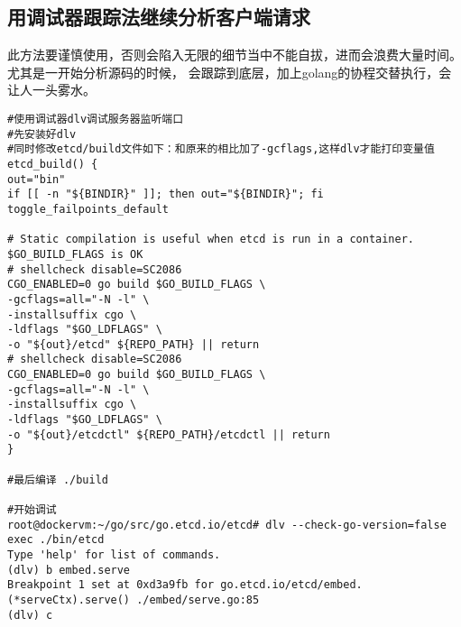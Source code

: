 \subsection{用调试器跟踪法继续分析客户端请求}
此方法要谨慎使用，否则会陷入无限的细节当中不能自拔，进而会浪费大量时间。尤其是一开始分析源码的时候，
会跟踪到底层，加上golang的协程交替执行，会让人一头雾水。
\begin{verbatim}
#使用调试器dlv调试服务器监听端口
#先安装好dlv
#同时修改etcd/build文件如下：和原来的相比加了-gcflags,这样dlv才能打印变量值
etcd_build() {
out="bin"
if [[ -n "${BINDIR}" ]]; then out="${BINDIR}"; fi
toggle_failpoints_default

# Static compilation is useful when etcd is run in a container. $GO_BUILD_FLAGS is OK
# shellcheck disable=SC2086
CGO_ENABLED=0 go build $GO_BUILD_FLAGS \
-gcflags=all="-N -l" \
-installsuffix cgo \
-ldflags "$GO_LDFLAGS" \
-o "${out}/etcd" ${REPO_PATH} || return
# shellcheck disable=SC2086
CGO_ENABLED=0 go build $GO_BUILD_FLAGS \
-gcflags=all="-N -l" \
-installsuffix cgo \
-ldflags "$GO_LDFLAGS" \
-o "${out}/etcdctl" ${REPO_PATH}/etcdctl || return
}

#最后编译 ./build

#开始调试
root@dockervm:~/go/src/go.etcd.io/etcd# dlv --check-go-version=false exec ./bin/etcd
Type 'help' for list of commands.
(dlv) b embed.serve
Breakpoint 1 set at 0xd3a9fb for go.etcd.io/etcd/embed.(*serveCtx).serve() ./embed/serve.go:85
(dlv) c

\end{verbatim}

